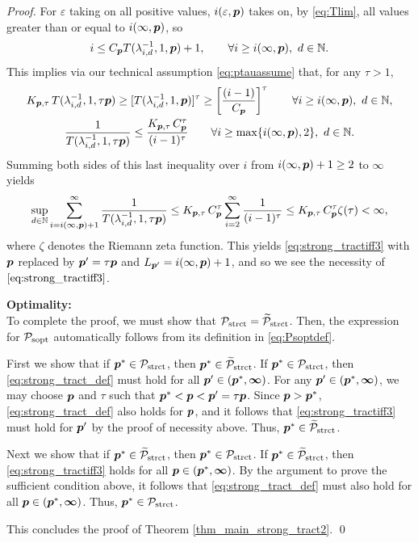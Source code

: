 \documentclass[sort&compress]{elsarticle}
\newcommand{\peter}[1]{\begingroup\color{violet}#1\endgroup}
\newcommand{\vinfty}{\boldsymbol{\infty}}
\begin{document}
\begin{proof}
For $\varepsilon$ taking on all positive values, $i(\varepsilon,\boldsymbol{p})$ takes on, \peter{by \eqref{eq:Tlim},} all values greater than or equal to $i(\infty,\boldsymbol{p})$, so
\[
i\le C_{\boldsymbol{p}} T(\lambda_{i,d}^{-1},1,\boldsymbol{p})+1, \qquad \forall i \ge i(\infty,\boldsymbol{p}), \ d \in \mathbb{N}.
\]
This implies via our technical assumption \eqref{eq:ptauassume} that, \peter{for any $\tau>1$,}
\begin{gather*}
 K_{\boldsymbol{p},\tau}\,T (\lambda_{i,d}^{-1},1,\tau \boldsymbol{p}) \ge
 [T(\lambda_{i,d}^{-1},1, \boldsymbol{p})]^\tau
 \ge
  \left[\frac{(i-1)}{C_{\boldsymbol{p}}}\right]^\tau \qquad \forall i \ge i(\infty,\boldsymbol{p}), \ d \in \mathbb{N}, \\
 \frac{1}{T (\lambda_{i,d}^{-1},1,\tau \boldsymbol{p})} \le
\frac{K_{\boldsymbol{p},\tau}\, C_{\boldsymbol{p}}^\tau}{(i-1)^\tau}\qquad \forall i \ge \max\{i(\infty,\boldsymbol{p}),2\}, \ d \in \mathbb{N} .
\end{gather*}
Summing both sides of this last inequality over $i$ from $i(\infty,\boldsymbol{p}) +1 \ge 2$ to $\vinfty$ yields
\begin{equation*}
\sup_{d\in\mathbb{N}} \sum_{i=i(\infty,\boldsymbol{p}) +1 }^\infty \frac{1}{T (\lambda_{i,d}^{-1},1, \tau \boldsymbol{p})}
 \le  K_{\boldsymbol{p},\tau}\, C_{\boldsymbol{p}}^\tau
\sum_{i=2}^\infty \frac{1}{(i-1)^\tau} \\
 \le K_{\boldsymbol{p},\tau}\, C_{\boldsymbol{p}}^\tau
\zeta (\tau)  < \infty,
\end{equation*}
where $\zeta$ denotes the Riemann zeta function.
This yields \eqref{eq:strong_tractiff3} with $\boldsymbol{p}$ replaced by $\boldsymbol{p}' = \tau \boldsymbol{p}$ and $L_{\boldsymbol{p}'} = i(\infty,\boldsymbol{p}) +1$, and so we see the necessity of $\eqref{eq:strong_tractiff3}$.

\bigskip
\noindent \textbf{Optimality:} \\
To complete the proof, we must show that $\mathcal{P}_{\textup{strct}} = \widetilde{\mathcal{P}}_{\textup{strct}}$.  Then, the expression for  $\mathcal{P}_{\textup{sopt}}$ automatically follows from its definition in \eqref{eq:Psoptdef}.

First we show  that if $\boldsymbol{p}^* \in \mathcal{P}_{\textup{strct}}$, then $\boldsymbol{p}^* \in \widetilde{\mathcal{P}}_{\textup{strct}}$.  If $\boldsymbol{p}^* \in \mathcal{P}_{\textup{strct}}$, then \eqref{eq:strong_tract_def} must hold for all $\vp' \in (\vp^*,\vinfty)$.  For any $\vp' \in (\vp^*,\vinfty)$, we may choose $\boldsymbol{p}$ and $\tau$ such that $\boldsymbol{p}^* < \boldsymbol{p} < \boldsymbol{p}' = \tau \boldsymbol{p}$. Since $\boldsymbol{p} > \boldsymbol{p}^*$, \eqref{eq:strong_tract_def} also holds for $\boldsymbol{p}$, and it follows that \eqref{eq:strong_tractiff3} must hold for $\boldsymbol{p}'$ by the proof of necessity above.  Thus, $\boldsymbol{p}^* \in \widetilde{\mathcal{P}}_{\textup{strct}}$.

Next we show that if $\boldsymbol{p}^* \in \widetilde{\mathcal{P}}_{\textup{strct}}$, then $\boldsymbol{p}^* \in \mathcal{P}_{\textup{strct}}$.  If $\boldsymbol{p}^* \in \widetilde{\mathcal{P}}_{\textup{strct}}$, then \eqref{eq:strong_tractiff3}  holds for all $\vp \in (\vp^*,\vinfty)$.  By the argument to prove the sufficient condition above, it follows that \eqref{eq:strong_tract_def} must also hold for all $\vp \in (\vp^*,\vinfty)$. Thus, $\boldsymbol{p}^* \in \mathcal{P}_{\textup{strct}}$.

\bigskip

\noindent This concludes the proof of  Theorem \ref{thm_main_strong_tract2}. \qed

\end{proof}
\end{document}
